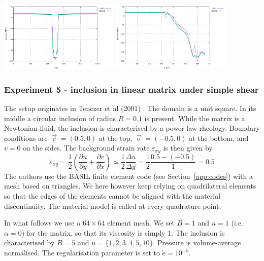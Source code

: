 \begin{center}
\includegraphics[width=5.7cm]{python_codes/fieldstone_87/results/experiment_04/horizontal_profile_p.pdf}
\includegraphics[width=5.7cm]{python_codes/fieldstone_87/results/experiment_04/vertical_profile_p.pdf}
\end{center}


\newpage
\subsubsection*{Experiment 5 - inclusion in linear matrix under simple shear}

The setup originates in Tenczer et al (2001) \cite{tesb01}. 
The domain is a unit square. In its middle a circular inclusion of radius $R=0.1$
is present. While the matrix is a Newtonian fluid, the inclusion is characterised
by a power law rheology. 
Boundary conditions are $\vec\upnu=(0.5,0)$ at the top, $\vec\upnu=(-0.5,0)$
at the bottom, and $v=0$ on the sides.
The background strain rate $\dot\varepsilon_{xy}$ is then given by
\[
\dot\varepsilon_{xy} = \frac{1}{2}\left( \frac{\partial u}{\partial y}+ \frac{\partial v}{\partial x} \right)
\simeq \frac{1}{2} \frac{\Delta u}{\Delta y}
= \frac{1}{2} \frac{0.5-(-0.5)}{1} = 0.5
\]
The authors use the BASIL finite element code (see Section~\ref{app:codes})
with a mesh based on triangles. We here however 
keep relying on quadrilateral elements so that the edges of the elements cannot be 
aligned with the material discontinuity. 
The material model is called at every quadrature point.  

In what follows we use a $64\times 64$ element mesh. 
We set $B=1$ and $n=1$ (i.e. $\alpha=0$) for the matrix, 
so that its viscosity is simply 1. The inclusion is characterised by $B=5$ and $n=\{1,2,3,4,5,10\}$.
Pressure is volume-average normalised. The regularisation parameter is set to $\dot{e}=10^{-5}$. 

